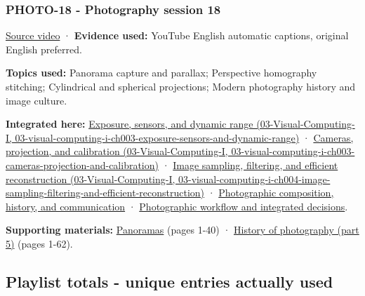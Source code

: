 \subsubsection{PHOTO-18 - Photography session 18}\label{04-visual-computing-ii-ch036-photo-18---photography-session-18}

\href{https://www.youtube.com/watch?v=fE0GQ9Tvn4U}{Source video} · \textbf{Evidence used:} YouTube English automatic captions, original English preferred.

\textbf{Topics used:} Panorama capture and parallax; Perspective homography stitching; Cylindrical and spherical projections; Modern photography history and image culture.

\textbf{Integrated here:} \href{../03-Visual-Computing-I/main.pdf\#nameddest=03-visual-computing-i-ch003-exposure-sensors-and-dynamic-range}{Exposure, sensors, and dynamic range (03-Visual-Computing-I, 03-visual-computing-i-ch003-exposure-sensors-and-dynamic-range)} · \href{../03-Visual-Computing-I/main.pdf\#nameddest=03-visual-computing-i-ch003-cameras-projection-and-calibration}{Cameras, projection, and calibration (03-Visual-Computing-I, 03-visual-computing-i-ch003-cameras-projection-and-calibration)} · \href{../03-Visual-Computing-I/main.pdf\#nameddest=03-visual-computing-i-ch004-image-sampling-filtering-and-efficient-reconstruction}{Image sampling, filtering, and efficient reconstruction (03-Visual-Computing-I, 03-visual-computing-i-ch004-image-sampling-filtering-and-efficient-reconstruction)} · \hyperref[04-visual-computing-ii-ch034-photographic-composition-history-and-communication]{Photographic composition, history, and communication} · \hyperref[04-visual-computing-ii-ch034-photographic-workflow-and-integrated-decisions]{Photographic workflow and integrated decisions}.

\textbf{Supporting materials:} \href{https://drive.google.com/open?id=0B6w2XfPHEcZYYVNCbmdFRUI1Zjg}{Panoramas} (pages 1-40) · \href{https://drive.google.com/open?id=0B6w2XfPHEcZYMU1OLTI2QUZQa1E}{History of photography (part 5)} (pages 1-62).

\subsection{Playlist totals - unique entries actually used}\label{04-visual-computing-ii-ch036-playlist-totals---unique-entries-actually-used}

